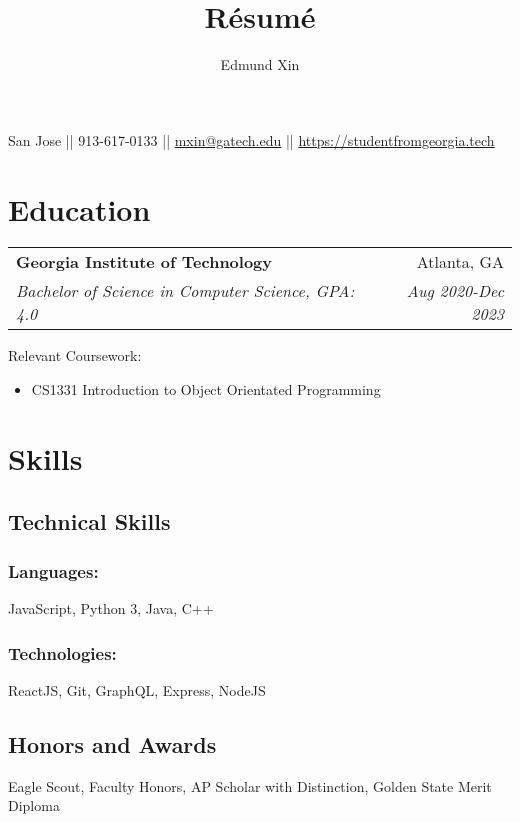 \documentclass[letterpaper,8pt]{article}
\makeatletter
\renewcommand{\maketitle}{
  \begin{center}
  {\huge\bfseries
  \theauthor}

  \vspace{0.25em}

  San Jose || 913-617-0133 || \href{mailto:mxin@gatech.edu}{mxin@gatech.edu} || \href{https://studentfromgeorgia.tech}{https://studentfromgeorgia.tech}

  \end{center}
}
\newcommand{\resumeSubheading}[4]{
  \vspace{0.25em}
  \begin{tabular*}{1\textwidth}[t]{l@{\extracolsep{\fill}}r}
    \textbf{#1} & #2 \\
    \textit{#3} & \textit{#4} \\
  \end{tabular*}\vspace{-5pt}
}
\makeatother
\begin{document}
\title{R\'esum\'e}
\author{Edmund Xin}

\maketitle

\section{Education}

\resumeSubheading{Georgia Institute of Technology}
{Atlanta, GA}{Bachelor of Science in Computer Science, GPA: 4.0
}{Aug 2020-Dec 2023}

Relevant Coursework:

\begin{itemize}[label=\raisebox{0.25ex}{\tiny$\bullet$}]
  \item CS1331 Introduction to Object Orientated Programming
\end{itemize}
\vspace{5pt}

\section{Skills}

\begin{multicols}{2}
\subsection{Technical Skills}

\subsubsection{Languages:}

JavaScript, Python 3, Java, C++

\subsubsection{Technologies:}

ReactJS, Git, GraphQL, Express, NodeJS

\columnbreak


\subsection{Honors and Awards}
Eagle Scout, Faculty Honors, AP Scholar with Distinction, Golden State Merit Diploma

\end{multicols}
\end{document}
